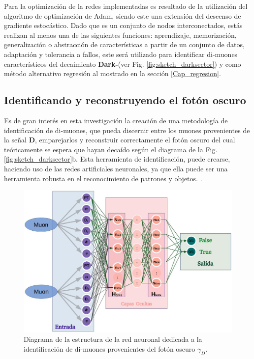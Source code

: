 Para la optimización de la redes implementadas es resultado de la utilización del algoritmo de optimización de Adam, siendo este una extensión del descenso de gradiente estocástico\citep{adam}. Dado que es un conjunto de nodos interconectados, estás realizan al menos una de las siguientes funciones: aprendizaje, memorización, generalización o abstracción de características a partir de un conjunto de datos, adaptación y tolerancia a fallos, este será utilizado para identificar di-muones característicos del decaimiento \textbf{Dark-}\SUSY (ver Fig. \ref{fig:sketch_darksector}) y como método alternativo regresión al mostrado en la sección \ref{Cap_regresion}.

\subsection{Identificando y reconstruyendo el fotón oscuro}\label{identificador_sec}

Es de gran interés en esta investigación la creación de una metodología de identificación de di-muones, que pueda discernir entre los muones provenientes de la señal \MSSM\textbf{D}, emparejarlos y reconstruir correctamente el fotón oscuro del cual teóricamente se espera que hayan decaído según el diagrama de la Fig. \ref{fig:sketch_darksector}b. Esta herramienta de identificación, puede crearse, haciendo uso de las redes artificiales neuronales, ya que ella puede ser una herramienta robusta en el reconocimiento de patrones y objetos.     .

\begin{figure}[!h]
\centering
\includegraphics[width=.9\textwidth]{Cap4/imagenes/IDENTIFICADOR.png}
\caption{Diagrama de la estructura de la red neuronal dedicada a la identificación de di-muones provenientes del fotón oscuro $\gamma_D$.}
\label{identificador}
\end{figure}

